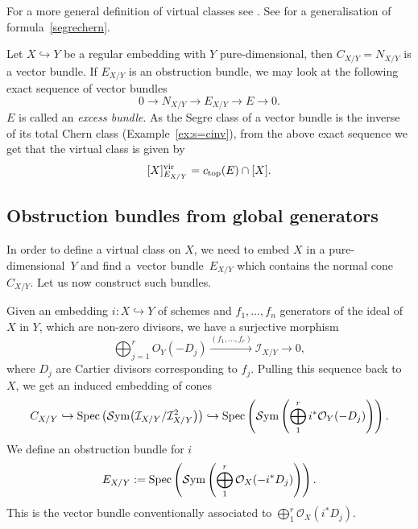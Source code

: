 \documentclass[pdftex]{sigma}
\numberwithin{equation}{section}
\newcommand{\vv}{\mathrm{vir}}
\theoremstyle{plain}
\theoremstyle{definition}
\theoremstyle{remark}
\begin{document}
\begin{Remark} For a more general definition of virtual classes see \cite[Definition 4.1]{siebert}. See \cite[Theorem~4.6]{siebert} for a generalisation of formula~\eqref{segrechern}.
\end{Remark}

\begin{Example}\label{excess}Let $X\hookrightarrow Y$ be a regular embedding with $Y$ pure-dimensional, then $C_{X/Y}=N_{X/Y}$ is a vector bundle. If $E_{X/Y}$ is an obstruction bundle, we may look at the following exact sequence of vector bundles
\[0\to N_{X/Y}\to E_{X/Y}\to E\to 0.\]
$E$ is called an \emph{excess bundle}. As the Segre class of a vector bundle is the inverse of its total Chern class (Example~\ref{ex:s=cinv}), from the above exact sequence we get that the virtual class is given by
\[[X]_{E_{X/Y}}^{\vv}=c_{\rm top}(E)\cap [X].\]
\end{Example}

\subsection{Obstruction bundles from global generators} \label{section:obs}
In order to define a virtual class on $X$, we need to embed $X$ in a pure-dimensional~$Y$ and find a~vector bundle~$E_{X/Y}$ which contains the normal cone~$C_{X/Y}$. Let us now construct such bundles.

Given an embedding $i\colon X\hookrightarrow Y$ of schemes and $f_1,\ldots, f_n$ generators of the ideal of~$X$ in $Y$, which are non-zero divisors, we have a surjective morphism
\[\bigoplus_{j=1}^rO_Y(-D_j)\xrightarrow{(f_1,\dots, f_r)}\mathcal{I}_{X/Y}\to 0, \]
where $D_j$ are Cartier divisors corresponding to $f_j$. Pulling this sequence back to $X$, we get an induced embedding of cones
\[C_{X/Y}\hookrightarrow\operatorname{Spec}\big({\mathcal S}{\rm ym}\big(\mathcal I_{X/Y}/\mathcal I_{X/Y}^2\big)\big)\hookrightarrow \operatorname{Spec}\left({\mathcal S}{\rm ym}\left(\bigoplus_1^ri^*\mathcal O_Y(-D_j)\right)\right).\]
We define an obstruction bundle for $i$
\[
E_{X/Y}:=\operatorname{Spec}\left({\mathcal S}{\rm ym}\left(\bigoplus_1^r\mathcal O_X(-i^*D_j)\right)\right).
\]
This is the vector bundle conventionally associated to $ \bigoplus_1^r\mathcal O_X(i^*D_j) $.
\end{document}
